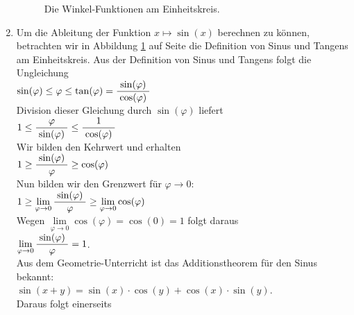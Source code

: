 \begin{enumerate}
 

      \begin{figure}[!h]
        \centering
        \caption{Die Winkel-Funktionen am Einheitskreis.}
        \label{fig:circle}
      \end{figure}
\item Um die Ableitung der Funktion $x \mapsto \sin(x)$ berechnen zu k\"onnen, 
      betrachten wir in Abbildung \ref{fig:circle} auf Seite \pageref{fig:circle} die Definition von
      Sinus und Tangens am Einheitskreis.  Aus der Definition von Sinus und Tangens folgt die Ungleichung 
      \\[0.3cm]
      \hspace*{1.3cm}
      $\sin(\varphi) \leq \varphi \leq \tan(\varphi) = \displaystyle\frac{\;\displaystyle\sin(\varphi)\;}{\;\displaystyle\cos(\varphi)\;}$
      \\[0.3cm]
      Division dieser Gleichung durch $\sin(\varphi)$ liefert
      \\[0.3cm]
      \hspace*{1.3cm}
      $1 \leq \displaystyle\frac{\;\displaystyle\varphi\;}{\;\displaystyle\sin(\varphi)\;} \leq \displaystyle\frac{\;\displaystyle1\;}{\;\displaystyle\cos(\varphi)\;}$
      \\[0.3cm]
      Wir bilden den Kehrwert und erhalten
      \\[0.3cm]
      \hspace*{1.3cm}
      $1 \geq \displaystyle\frac{\;\displaystyle\sin(\varphi)\;}{\;\displaystyle\varphi\;} \geq \cos(\varphi)$
      \\[0.3cm]
      Nun bilden wir den Grenzwert f\"ur $\varphi \rightarrow 0$:
      \\[0.3cm]
      \hspace*{1.3cm}
      $1 \geq \lim\limits_{\varphi \rightarrow 0} \displaystyle\frac{\;\displaystyle\sin(\varphi)\;}{\;\displaystyle\varphi\;} \geq \lim\limits_{\varphi \rightarrow 0}\cos(\varphi)$
      \\[0.3cm]
      Wegen $\lim\limits_{\varphi \rightarrow 0} \cos(\varphi) = \cos(0) = 1$ folgt daraus
      \\[0.1cm]
      \hspace*{1.3cm}
      $\lim\limits_{\varphi \rightarrow 0} \displaystyle\frac{\;\displaystyle\sin(\varphi)\;}{\;\displaystyle\varphi\;} = 1$.
      \\[0.3cm]
       Aus dem Geometrie-Unterricht ist das Additionstheorem f\"ur den Sinus 
       bekannt: 
       \\[0.3cm]
       \hspace*{1.3cm} $\sin(x+y) = \sin(x) \cdot \cos(y) + \cos(x) \cdot \sin(y)$.
         \\[0.2cm]
       Daraus folgt einerseits
       \\[0.3cm]

\end{enumerate}
